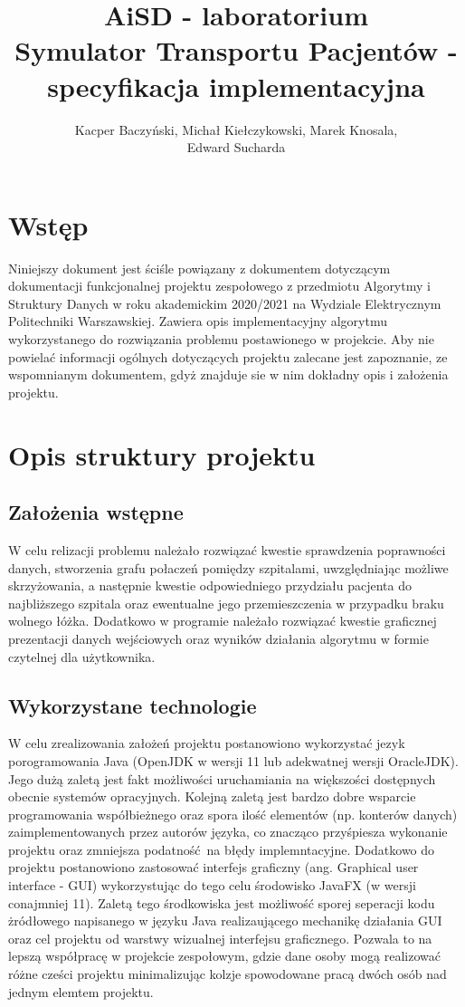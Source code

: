 \documentclass[10pt,a4paper]{article}
\title{\huge AiSD - laboratorium \\ \Large Symulator Transportu Pacjentów - specyfikacja implementacyjna}
\author{Kacper Baczyński, Michał Kiełczykowski, Marek Knosala, \\ Edward Sucharda}
\begin{document}
\maketitle

\section{Wstęp}

Niniejszy dokument jest ściśle powiązany z dokumentem dotyczącym dokumentacji funkcjonalnej projektu zespołowego z przedmiotu Algorytmy i Struktury Danych w roku akademickim 2020/2021 na Wydziale Elektrycznym Politechniki Warszawskiej.
Zawiera opis implementacyjny algorytmu wykorzystanego do rozwiązania problemu postawionego w projekcie.
Aby nie powielać informacji ogólnych dotyczących projektu zalecane jest zapoznanie, ze wspomnianym dokumentem, gdyż znajduje sie w nim dokładny opis i założenia projektu.

\section{Opis struktury projektu}

\subsection{Założenia wstępne}


W celu relizacji problemu należało rozwiązać kwestie sprawdzenia poprawności danych, stworzenia grafu połaczeń pomiędzy szpitalami, uwzględniając możliwe skrzyżowania, a następnie kwestie odpowiedniego przydziału pacjenta do najbliższego
szpitala oraz ewentualne jego przemieszczenia w przypadku braku wolnego łóżka.
Dodatkowo w programie należało rozwiązać kwestie graficznej prezentacji danych wejściowych oraz wyników działania algorytmu w formie czytelnej dla użytkownika.

\subsection{Wykorzystane technologie}

W celu zrealizowania założeń projektu postanowiono wykorzystać jezyk porogramowania Java (OpenJDK w wersji 11 lub adekwatnej wersji OracleJDK).
Jego dużą zaletą jest fakt możliwości uruchamiania na większości dostępnych obecnie systemów opracyjnych.
Kolejną zaletą jest bardzo dobre wsparcie programowania współbieżnego oraz spora ilość elementów (np. konterów danych) zaimplementowanych przez autorów języka, co znacząco przyśpiesza wykonanie projektu oraz zmniejsza podatność na błędy implemntacyjne.
Dodatkowo do projektu postanowiono zastosować interfejs graficzny (ang. Graphical user interface - GUI) wykorzystując do tego celu środowisko JavaFX (w wersji conajmniej 11).
Zaletą tego środkowiska jest możliwość sporej seperacji kodu żródłowego napisanego w języku Java realizaującego mechanikę działania GUI oraz cel projektu od warstwy wizualnej interfejsu graficznego.
Pozwala to na lepszą współpracę w projekcie zespołowym, gdzie dane osoby mogą realizować różne cześci projektu minimalizując kolzje spowodowane pracą dwóch osób nad jednym elemtem projektu.
\end{document}
